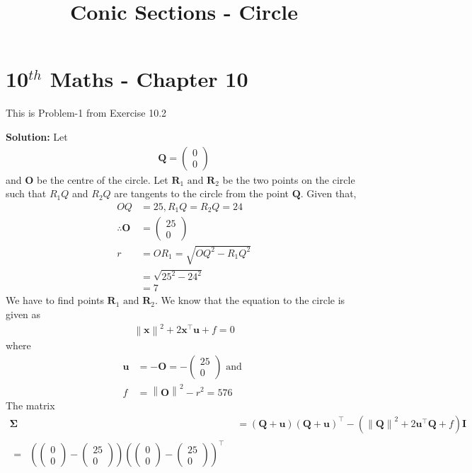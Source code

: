 \documentclass[12pt]{article}
\providecommand{\brak}[1]{\ensuremath{\left(#1\right)}}
\providecommand{\norm}[1]{\left\lVert#1\right\rVert}
\newcommand{\solution}{\noindent \textbf{Solution: }}
\newcommand{\myvec}[1]{\ensuremath{\begin{pmatrix}#1\end{pmatrix}}}
\let\vec\mathbf
\begin{document}
\begin{center}
\title{\textbf{Conic Sections - Circle}}
\date{\vspace{-5ex}} %
\maketitle
\end{center}
\setcounter{page}{1}

\section{10$^{th}$ Maths - Chapter 10}
This is Problem-1 from Exercise 10.2
\begin{enumerate}
\solution 
\fi
Let
\begin{align}
		\vec{Q} =\myvec{0 \\ 0}
\end{align}
and
$\vec{O}$ be the centre of the circle.  Let $\vec{R}_1 \text{ and } \vec{R}_2$ be the two points on the circle such that $R_1Q$ and $R_2Q$ are tangents to the circle from the point $\vec{Q}$. Given that,  
\begin{align}
	OQ &= 25, R_1Q = R_2Q = 24 \\ 
	\therefore \vec{O} &= \myvec{25 \\ 0} \\
	r &= OR_1 = \sqrt{OQ^2 - R_1Q^2}  \\
	&= \sqrt{25^2 - 24^2} \\
	&= 7
\end{align}
We have to find points $\vec{R}_1 \text{ and } \vec{R}_2$. 
We know that the equation to the circle is given as
\begin{align}
	\label{eq:chapters/10/10/2/1/circEq1}
	\norm{\vec{x}}^2+2\vec{x}^\top\vec{u}+f = 0 
\end{align}
where
\begin{align}
	\vec{u} &= -\vec{O}  = -\myvec{25\\0}\text{ and } \\
        \label{eq:chapters/10/10/2/1/fRelation}
	f &= \norm{\vec{O}}^2 - r^2 = 576
\end{align}
The matrix
\begin{align}
	\vec{\Sigma} &= \brak{\vec{Q}+\vec{u}}\brak{\vec{Q}+\vec{u}}^\top - \brak{\norm{\vec{Q}}^2+2\vec{u}^\top\vec{Q}+f}\vec{I}
	\\
  \begin{split}
	={}& \brak{\myvec{0\\0}-\myvec{25\\0}}\brak{\myvec{0\\0}-\myvec{25\\0}}^\top \\

\end{split}
\end{align}
\end{enumerate}
\end{document}
